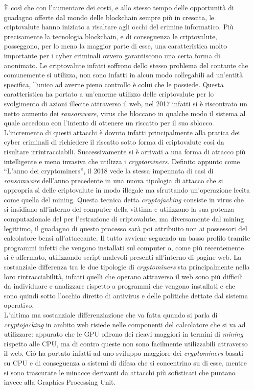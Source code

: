 \documentclass[
11pt, %
oneside, %
italian, %
onehalfspacing,%
headsepline, %
]{MastersDoctoralThesis} %
\begin{document}
È così che con l'aumentare dei costi, e allo stesso tempo delle opportunità di guadagno offerte dal mondo delle blockchain sempre più in crescita, le criptovalute hanno iniziato a risaltare agli occhi del crimine informatico. Più precisamente la tecnologia blockchain, e di conseguenza le criptovalute, posseggono, per lo meno la maggior parte di esse, una caratteristica molto importante per i cyber criminali ovvero garantiscono una certa forma di anonimato. Le criptovalute infatti soffrono dello stesso problema del contante che comunemente si utilizza, non sono infatti in alcun modo collegabili ad un'entità specifica, l'unico ad averne pieno controllo è colui che le possiede. Questa caratteristica ha portato a un'enorme utilizzo delle criptovalute per lo svolgimento di azioni illecite attraverso il web, nel 2017 infatti si è riscontrato un netto aumento dei \emph{ransomware}, virus che bloccano in qualche modo il sistema al quale accedono con l'intento di ottenere un riscatto per il suo sblocco. L'incremento di questi attacchi è dovuto infatti principalmente alla pratica dei cyber criminali di richiedere il riscatto sotto forma di criptovalute così da risultare irrintracciabili. Successivamente si è arrivati a una forma di attacco più intelligente e meno invasiva che utilizza i \emph{cryptominers}. Definito appunto come ``L'anno dei cryptominers'', il 2018 vede la stessa impennata di casi di \emph{ransomware} dell'anno precedente in una nuova tipologia di attacco che si appropria sì delle criptovalute in modo illegale ma sfruttando un'operazione lecita come quella del mining. Questa tecnica detta \emph{cryptojacking} consiste in virus che si insidiano all'interno del computer della vittima e utilizzano la sua potenza computazionale del per l'estrazione di criptovalute, ma diversamente dal mining legittimo, il guadagno di questo processo sarà poi attribuito non ai possessori del calcolatore bensì all'attaccante. Il tutto avviene seguendo un basso profilo tramite programmi infetti che vengono installati sul computer o, come più recentemente si è affermato, utilizzando script malevoli presenti all'interno di pagine web. La sostanziale differenza tra le due tipologie di \emph{cryptominers} sta principalmente nella loro rintracciabilità, infatti quelli che operano attraverso il web sono più difficili da individuare e analizzare rispetto a programmi che vengono installati e che sono quindi sotto l'occhio diretto di antivirus e delle politiche dettate dal sistema operativo.\\
L'ultima ma sostanziale differenziazione che va fatta quando si parla di \emph{cryptojacking} in ambito web risiede nelle componenti del calcolatore che si va ad utilizzare: appurato che le GPU offrono dei ricavi maggiori in termini di \emph{mining} rispetto alle CPU, ma di contro queste non sono facilmente utilizzabili attraverso il web. Ciò ha portato infatti ad uno sviluppo maggiore dei \emph{cryptominers} basati su CPU e di conseguenza a sistemi di difesa che si concentrino su di esse, mentre si sono trascurate le minacce derivanti da attacchi più sofisticati che puntano invece alla Graphics Processing Unit.
\end{document}
